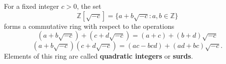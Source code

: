 For a fixed integer $c > 0$, the set
$$\mathbb{Z}[\sqrt{-c}] = \{a + b\sqrt{-c} : a, b \in \mathbb{Z}\}$$
forms a commutative ring with respect to the operations
$$(a + b\sqrt{-c}) + (c + d\sqrt{-c}) = (a+c) + (b+d)\sqrt{-c}$$
$$(a + b\sqrt{-c})(c + d\sqrt{-c}) = (ac - bcd) + (ad + bc)\sqrt{-c}.$$
Elements of this ring are called \textbf{quadratic integers} or \textbf{surds}.
